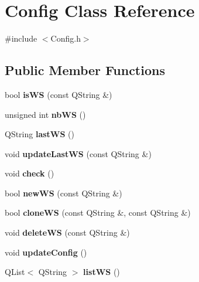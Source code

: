 \hypertarget{classConfig}{\section{\-Config \-Class \-Reference}
\label{classConfig}
}


{\ttfamily \#include $<$\-Config.\-h$>$}

\subsection*{\-Public \-Member \-Functions}
\begin{DoxyCompactItemize}
\item 
\hypertarget{classConfig_aa671501a3bd9abc615dd2336256834ba}{bool {\bfseries is\-W\-S} (const \-Q\-String \&)}\label{classConfig_aa671501a3bd9abc615dd2336256834ba}

\item 
\hypertarget{classConfig_a09b007f6a73298d418c4827a6d9ed935}{unsigned int {\bfseries nb\-W\-S} ()}\label{classConfig_a09b007f6a73298d418c4827a6d9ed935}

\item 
\hypertarget{classConfig_a9a2b5c7f56ae9c8332631b075cf66ecc}{\-Q\-String {\bfseries last\-W\-S} ()}\label{classConfig_a9a2b5c7f56ae9c8332631b075cf66ecc}

\item 
\hypertarget{classConfig_a5274a8150fda0e3f42c436c4addae082}{void {\bfseries update\-Last\-W\-S} (const \-Q\-String \&)}\label{classConfig_a5274a8150fda0e3f42c436c4addae082}

\item 
\hypertarget{classConfig_a2d04091f571813bab7171cf713917aff}{void {\bfseries check} ()}\label{classConfig_a2d04091f571813bab7171cf713917aff}

\item 
\hypertarget{classConfig_aea1c0e81b837e3afc951d1636df8baec}{bool {\bfseries new\-W\-S} (const \-Q\-String \&)}\label{classConfig_aea1c0e81b837e3afc951d1636df8baec}

\item 
\hypertarget{classConfig_af4a8f10b899329e3b804e346fd303ac5}{bool {\bfseries clone\-W\-S} (const \-Q\-String \&, const \-Q\-String \&)}\label{classConfig_af4a8f10b899329e3b804e346fd303ac5}

\item 
\hypertarget{classConfig_ab658ef4d4ec727d7e3e865fb1665611a}{void {\bfseries delete\-W\-S} (const \-Q\-String \&)}\label{classConfig_ab658ef4d4ec727d7e3e865fb1665611a}

\item 
\hypertarget{classConfig_a20ca0832e5cc6c20fb1fedf5464d1b7c}{void {\bfseries update\-Config} ()}\label{classConfig_a20ca0832e5cc6c20fb1fedf5464d1b7c}

\item 
\hypertarget{classConfig_a328b9ebe89ccaa52f0f8732191c8a28a}{\-Q\-List$<$ \-Q\-String $>$ {\bfseries list\-W\-S} ()}\label{classConfig_a328b9ebe89ccaa52f0f8732191c8a28a}

\end{DoxyCompactItemize}


